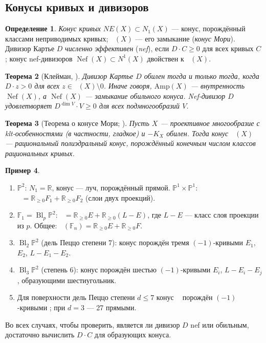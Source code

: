 \documentclass[11pt,a4paper]{article}
\theoremstyle{plain}
\newtheorem{theorem}{Теорема}[section]
\theoremstyle{definition}
\newtheorem{definition}[theorem]{Определение}
\newtheorem{example}[theorem]{Пример}
\theoremstyle{remark}
\newcommand{\R}{\mathbb{R}}
\newcommand{\PP}{\mathbb{P}}
\DeclareMathOperator{\Bl}{Bl}
\DeclareMathOperator{\NE}{\overline{NE}}
\DeclareMathOperator{\Nef}{Nef}
\begin{document}
\subsection{Конусы кривых и дивизоров}

\begin{definition}
\emph{Конус кривых} $NE(X)\subset N_1(X)$ --- конус, порождённый классами неприводимых кривых;
$\NE(X)$ --- его замыкание (\emph{конус Мори}). Дивизор Картье $D$ \emph{численно эффективен}
(\emph{nef}), если $D\cdot C\ge0$ для всех кривых $C$; конус nef-дивизоров $\Nef(X)\subset N^1(X)$
двойствен к $\NE(X)$.
\end{definition}

\begin{theorem}[{Клейман, \cite[1.4.23]{La}}]\label{thm:Kleiman}
Дивизор Картье $D$ обилен тогда и только тогда, когда $D\cdot z>0$ для всех $z\in\NE(X)\setminus0$.
Иначе говоря, $\mathrm{Amp}(X)$ --- внутренность $\Nef(X)$, а $\Nef(X)$ --- замыкание обильного
конуса. Nef-дивизор $D$ удовлетворяет $D^{\dim V}\cdot V\ge0$ для всех подмногообразий $V$.
\end{theorem}

\begin{theorem}[{Теорема о конусе Мори; \cite[1.24, 3.7]{KM}}]\label{thm:cone}
Пусть $X$ --- проективное многообразие с klt-особенностями \textup{(}в частности, гладкое\textup{)} и $-K_X$ обилен.
Тогда конус $\NE(X)$ --- рациональный полиэдральный конус, порождённый конечным числом классов
рациональных кривых.
\end{theorem}

\begin{example}\label{ex:cones}
\begin{enumerate}
\item $\PP^2$: $N_1=\R$, конус --- луч, порождённый прямой. $\PP^1\times\PP^1$: $\NE=\R_{\ge0}F_1+\R_{\ge0}F_2$
(слои двух проекций).
\item $\mathbb F_1=\Bl_p\PP^2$: $\NE=\R_{\ge0}E+\R_{\ge0}(L-E)$, где $L-E$ --- класс слоя
проекции из $p$. Общее: $\NE(\mathbb F_n)=\R_{\ge0}E+\R_{\ge0}F$.
\item $\Bl_2\PP^2$ (дель Пеццо степени 7): конус порождён тремя $(-1)$-кривыми $E_1$, $E_2$,
$L-E_1-E_2$.
\item $\Bl_3\PP^2$ (степень 6): конус порождён шестью $(-1)$-кривыми $E_i$, $L-E_i-E_j$,
образующими шестиугольник.
\item Для поверхности дель Пеццо степени $d\le7$ конус $\NE$ порождён $(-1)$-кривыми
\cite[8.2]{Do}; при $d=3$ --- 27 прямыми.
\end{enumerate}
Во всех случаях, чтобы проверить, является ли дивизор $D$ nef или обильным, достаточно вычислить
$D\cdot C$ для образующих конуса.
\end{example}
\end{document}
